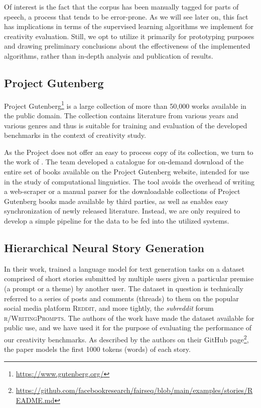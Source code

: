 Of interest is the fact that the corpus has been manually tagged for parts of speech, a process that tends to be error-prone. %
As we will see later on, this fact has implications in terms of the supervised learning algorithms we implement for creativity evaluation. Still, we opt to utilize it primarily for prototyping purposes and drawing preliminary conclusions about the effectiveness of the implemented algorithms, rather than in-depth analysis and publication of results.

\subsection{Project Gutenberg}
Project Gutenberg\footnote[1]{\url{https://www.gutenberg.org/}} is a large collection of more than 50,000 works available in the public domain. The collection contains literature from various years and various genres and thus is suitable for training and evaluation of the developed benchmarks in the context of creativity study. 

As the Project does not offer an easy to process copy of its collection, we turn to the work of \cite{DBLP:journals/corr/abs-1812-08092}. The team developed a catalogue for on-demand download of the entire set of books available on the Project Gutenberg website, intended for use in the study of computational linguistics. The tool avoids the overhead of writing a web-scraper or a manual parser for the downloadable collections of Project Gutenberg books made available by third parties, as well as enables easy synchronization of newly released literature. Instead, we are only required to develop a simple pipeline for the data to be fed into the utilized systems. 

\subsection{Hierarchical Neural Story Generation}
In their work, \cite{fan_hierarchical_2018} trained a language model for text generation tasks on a dataset comprised of short stories submitted by multiple users given a particular premise (a prompt or a theme) by another user.  The dataset in question is technically referred to a series of posts and comments (threads) to them on the popular social media platform \textsc{Reddit}, and more tightly, the \textit{subreddit} forum \textsc{r/WritingPrompts}. The authors of the work \cite{fan_hierarchical_2018} have made the dataset available for public use, and we have used it for the purpose of evaluating the performance of our creativity benchmarks. As described by the authors on their GitHub page\footnote{\url{https://github.com/facebookresearch/fairseq/blob/main/examples/stories/README.md}}, the paper models the first 1000 tokens (words) of each story.

